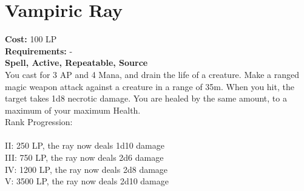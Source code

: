 \section{Vampiric Ray}\label{spell:vampiricRay}
\textbf{Cost:} 100 LP\\
\textbf{Requirements:} -\\
\textbf{Spell, Active, Repeatable, Source}\\
You cast for 3 AP and 4 Mana, and drain the life of a creature.
Make a ranged magic weapon attack against a creature in a range of 35m.
When you hit, the target takes 1d8 necrotic damage.
You are healed by the same amount, to a maximum of your maximum Health.
\\
Rank Progression:\\
\\
II: 250 LP, the ray now deals 1d10 damage\\
III: 750 LP, the ray now deals 2d6 damage\\
IV: 1200 LP, the ray now deals 2d8 damage\\
V: 3500 LP, the ray now deals 2d10 damage\\